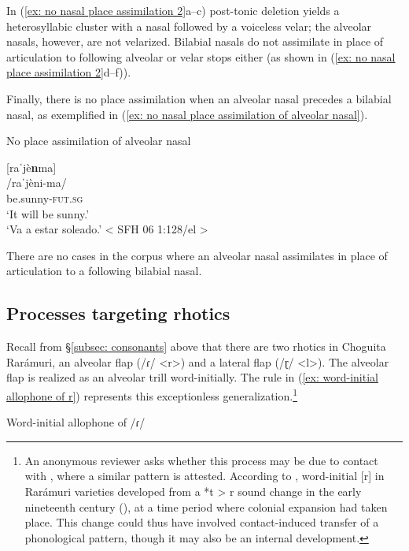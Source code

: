 In (\ref{ex: no nasal place assimilation 2}a--c) post-tonic deletion yields a heterosyllabic cluster with a nasal followed by a voiceless velar; the alveolar nasals, however, are not velarized. Bilabial nasals do not assimilate in place of articulation to following alveolar or velar stops either (as shown in (\ref{ex: no nasal place assimilation 2}d--f)).

Finally, there is no place assimilation when an alveolar nasal precedes a bilabial nasal, as exemplified in (\ref{ex: no nasal place assimilation of alveolar nasal}).

\ea\label{ex: no nasal place assimilation of alveolar nasal}
{No place assimilation of alveolar nasal}

    [raˈjè\textbf{n}ma] \\
    \glt    /raˈjèni-ma/  \\
            be.sunny-\textsc{fut.sg}\\
    \glt    `It will be sunny.'\\
    \glt    `Va a estar soleado.' < SFH 06 1:128/el >\\

\z

There are no cases in the corpus where an alveolar nasal assimilates in place of articulation to a following bilabial nasal.

\subsection{Processes targeting rhotics}
\label{subsec: processes targeting rhotics}
\largerpage
Recall from §\ref{subsec: consonants} above that there are two rhotics in Choguita Rarámuri, an alveolar flap (/ɾ/ <r>) and a lateral flap (/ɽ/ <l>). The alveolar flap is realized as an alveolar trill word-initially. The rule in (\ref{ex: word-initial allophone of r}) represents this exceptionless generalization.\footnote{An anonymous reviewer asks whether this process may be due to contact with , where a similar pattern is attested. According to \citet{merrill2014ralamuli}, word-initial [r] in Rarámuri varieties developed from a *t > r sound change in the early nineteenth century (\citeyear[242]{merrill2014ralamuli}), at a time period where colonial expansion had taken place. This change could thus have involved contact-induced transfer of a phonological pattern, though it may also be an internal development.}

\ea\label{ex: word-initial allophone of r}
{Word-initial allophone of /ɾ/}

